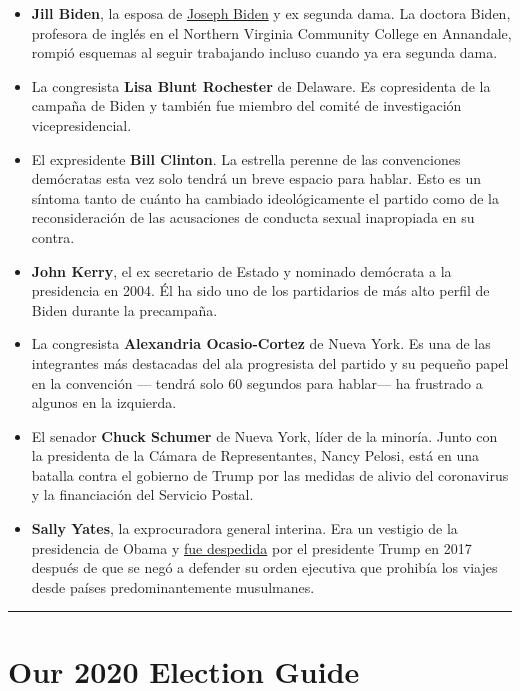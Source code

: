 \begin{itemize}
\item
  \textbf{Jill Biden}, la esposa de
  \href{https://www.nytimes3xbfgragh.onion/interactive/2020/us/elections/joe-biden.html}{Joseph
  Biden} y ex segunda dama. La doctora Biden, profesora de inglés en el
  Northern Virginia Community College en Annandale, rompió esquemas al
  seguir trabajando incluso cuando ya era segunda dama.
\item
  La congresista \textbf{Lisa Blunt Rochester} de Delaware. Es
  copresidenta de la campaña de Biden y también fue miembro del comité
  de investigación vicepresidencial.
\item
  El expresidente \textbf{Bill Clinton}. La estrella perenne de las
  convenciones demócratas esta vez solo tendrá un breve espacio para
  hablar. Esto es un síntoma tanto de cuánto ha cambiado ideológicamente
  el partido como de la reconsideración de las acusaciones de conducta
  sexual inapropiada en su contra.
\item
  \textbf{John Kerry}, el ex secretario de Estado y nominado demócrata a
  la presidencia en 2004. Él ha sido uno de los partidarios de más alto
  perfil de Biden durante la precampaña.
\item
  La congresista \textbf{Alexandria Ocasio-Cortez} de Nueva York. Es una
  de las integrantes más destacadas del ala progresista del partido y su
  pequeño papel en la convención --- tendrá solo 60 segundos para
  hablar--- ha frustrado a algunos en la izquierda.
\item
  El senador \textbf{Chuck Schumer} de Nueva York, líder de la minoría.
  Junto con la presidenta de la Cámara de Representantes, Nancy Pelosi,
  está en una batalla contra el gobierno de Trump por las medidas de
  alivio del coronavirus y la financiación del Servicio Postal.
\item
  \textbf{Sally Yates}, la exprocuradora general interina. Era un
  vestigio de la presidencia de Obama y
  \href{https://www.nytimes3xbfgragh.onion/2017/01/30/us/politics/trump-immigration-ban-memo.html}{fue
  despedida} por el presidente Trump en 2017 después de que se negó a
  defender su orden ejecutiva que prohibía los viajes desde países
  predominantemente musulmanes.
\end{itemize}

\begin{center}\rule{0.5\linewidth}{\linethickness}\end{center}

\hypertarget{our-2020-election-guide}{%
\section{Our 2020 Election Guide}\label{our-2020-election-guide}}


